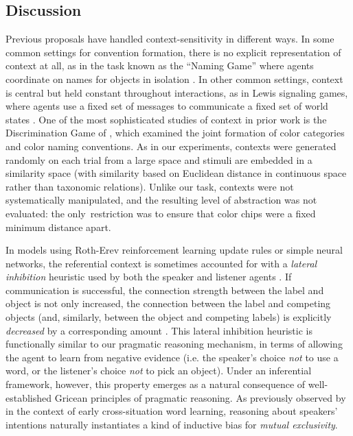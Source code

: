 \subsection{Discussion}

Previous proposals have handled context-sensitivity in different ways.
In some common settings for convention formation, there is no explicit representation of context at all, as in the task known as the ``Naming Game'' where agents coordinate on names for objects in isolation \cite{Baronchelli,oldnaminggame}. 
In other common settings, context is central but held constant throughout interactions, as in Lewis signaling games, where agents use a fixed set of messages to communicate a fixed set of world states \cite{lewis,signalinggame}.
One of the most sophisticated studies of context in prior work is the Discrimination Game of , which examined the joint formation of color categories and color naming conventions.
As in our experiments, contexts were generated randomly on each trial from a large space and stimuli are embedded in a similarity space (with similarity based on Euclidean distance in continuous space rather than taxonomic relations).
Unlike our task, contexts were not systematically manipulated, and the resulting level of abstraction was not evaluated: the only restriction was to ensure that color chips were a fixed minimum distance apart.

In models using Roth-Erev reinforcement learning update rules or simple neural networks, the referential context is sometimes accounted for with a \emph{lateral inhibition} heuristic used by both the speaker and listener agents \cite{franke2012bidirectional}.
If communication is successful, the connection strength between the label and object is not only increased, the connection between the label and competing objects (and, similarly, between the object and competing labels) is explicitly \emph{decreased} by a corresponding amount \cite<see also>{steels2005coordinating}.
This lateral inhibition heuristic is functionally similar to our pragmatic reasoning mechanism, in terms of allowing the agent to learn from negative evidence (i.e. the speaker's choice \emph{not} to use a word, or the listener's choice \emph{not} to pick an object). 
Under an inferential framework, however, this property emerges as a natural consequence of well-established Gricean principles of pragmatic reasoning.
As previously observed by \cite{FrankGoodmanTenenbaum09_Wurwur} in the context of early cross-situation word learning, reasoning about speakers' intentions naturally instantiates a kind of inductive bias for \emph{mutual exclusivity}.


